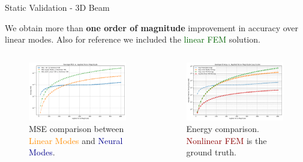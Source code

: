 \documentclass[9pt]{beamer}
\begin{document}
\begin{frame}{Static Validation - 3D Beam}
    
    We obtain more than \textbf{one order of magnitude} improvement in accuracy over linear modes. Also for reference we included the \textcolor{darkgreen}{linear FEM} solution.
    \vspace{-1em}

    \begin{columns}[T]
        \begin{column}{0.5\textwidth}
   
            \begin{figure}
                \includegraphics[width=\textwidth]{Images/beam_static_mse.png}
                \caption{MSE comparison between \textcolor{darkorange}{Linear Modes} and \textcolor{darkblue}{Neural Modes}.}
            \end{figure}
        \end{column}
        
        \begin{column}{0.5\textwidth}
            \begin{figure}
                \includegraphics[width=\textwidth]{Images/beam_static_energy.png}
                \caption{Energy comparison. \textcolor{darkred}{Nonlinear FEM} is the ground truth.}
            \end{figure}
        \end{column}
    \end{columns}
\end{frame}
\end{document}
